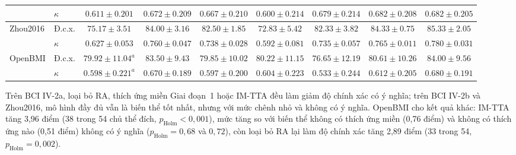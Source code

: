 \documentclass[preprint,12pt]{elsarticle}
\begin{document}
\begin{table}[!htbp]
\begin{adjustbox}{max width=\textwidth}
\begin{tabular}{llccccccc}
 & $\kappa$ & $0.611\pm0.201$ & $0.672\pm0.209$ & $0.667\pm0.210$ & $0.600\pm0.214$ & $0.679\pm0.214$ & $\mathbf{0.682\pm0.208}$ & $\mathbf{0.682\pm0.205}$ \\
\midrule
\multirow{2}{*}{Zhou2016}
 & Đ.c.x. & $75.17\pm3.51$ & $84.00\pm3.16$ & $82.50\pm1.85$ & $72.83\pm5.42$ & $82.33\pm3.82$ & $84.33\pm0.75$ & $\mathbf{85.33\pm2.05}$ \\
 & $\kappa$ & $0.627\pm0.053$ & $0.760\pm0.047$ & $0.738\pm0.028$ & $0.592\pm0.081$ & $0.735\pm0.057$ & $0.765\pm0.011$ & $\mathbf{0.780\pm0.031}$ \\
\midrule
\multirow{2}{*}{OpenBMI}
 & Đ.c.x. & $79.92\pm11.04^{a}$ & $83.50\pm9.43$ & $79.85\pm10.02$ & $80.22\pm11.15$ & $76.65\pm12.19$ & $80.61\pm10.26$ & $\mathbf{84.00\pm9.56}$ \\
 & $\kappa$ & $0.598\pm0.221^{a}$ & $0.670\pm0.189$ & $0.597\pm0.200$ & $0.604\pm0.223$ & $0.533\pm0.244$ & $0.612\pm0.205$ & $\mathbf{0.680\pm0.191}$ \\
\bottomrule
\end{tabular}
\end{adjustbox}
\end{table}

Trên BCI IV-2a, loại bỏ RA, thích ứng miền Giai đoạn~1 hoặc IM-TTA đều làm giảm độ chính xác có ý nghĩa; trên BCI IV-2b và Zhou2016, mô hình đầy đủ vẫn là biến thể tốt nhất, nhưng với mức chênh nhỏ và không có ý nghĩa. OpenBMI cho kết quả khác: IM-TTA tăng 3,96 điểm (38 trong 54 chủ thể đích, $p_\mathrm{Holm}<0{,}001$), mức tăng so với biến thể không có thích ứng miền (0,76 điểm) và không có thích ứng nào (0,51 điểm) không có ý nghĩa ($p_\mathrm{Holm}=0{,}68$ và $0{,}72$), còn loại bỏ RA lại làm độ chính xác tăng 2,89 điểm (33 trong 54, $p_\mathrm{Holm}=0{,}002$).
\end{document}
